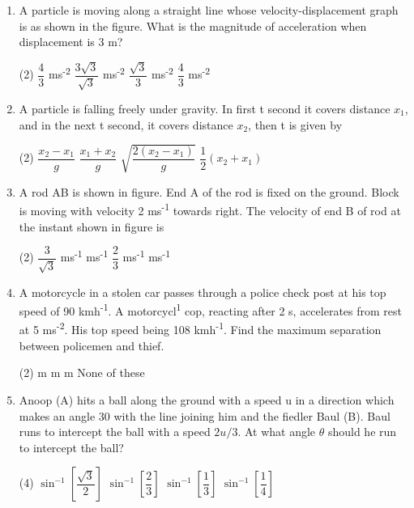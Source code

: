 \documentclass{article}
\renewcommand{\frac}[2]{\dfrac{#1}{#2}}
\begin{document}
\begin{enumerate}
    \item A particle is moving along a straight line whose velocity-displacement graph is as shown in the figure. What is the magnitude of acceleration when displacement is 3 m?
    \begin{tasks}(2)
        \task $\frac{4}{3}$ ms\textsuperscript{-2}
        \task $\frac{3\sqrt{3}}{\sqrt{3}}$ ms\textsuperscript{-2}
        \task $\frac{\sqrt{3}}{3}$ ms\textsuperscript{-2}
        \task $\frac{4}{3}$ ms\textsuperscript{-2}
    \end{tasks}

    \item A particle is falling freely under gravity. In first t second it covers distance $x_1$, and in the next t second, it covers distance $x_2$, then t is given by
    \begin{tasks}(2)
        \task $\frac{x_2 - x_1}{g}$
        \task $\frac{x_1 + x_2}{g}$
        \task $\sqrt{\frac{2(x_2 - x_1)}{g}}$
        \task $\frac{1}{2}(x_2 + x_1)$
    \end{tasks}

    \item A rod AB is shown in figure. End A of the rod is fixed on the ground. Block is moving with velocity 2 ms\textsuperscript{-1} towards right. The velocity of end B of rod at the instant shown in figure is
    \begin{tasks}(2)
        \task $\frac{3}{\sqrt{3}}$ ms\textsuperscript{-1}
         ms\textsuperscript{-1}
        \task $\frac{2}{3}$ ms\textsuperscript{-1}
         ms\textsuperscript{-1}
    \end{tasks}
    
    \item A motorcycle in a stolen car passes through a police check post at his top speed of 90 kmh\textsuperscript{-1}. A motorcycl\textsuperscript{1} cop, reacting after 2 s, accelerates from rest at 5 ms\textsuperscript{-2}. His top speed being 108 kmh\textsuperscript{-1}. Find the maximum separation between policemen and thief.
    \begin{tasks}(2)
         m
         m
         m
        \task None of these
    \end{tasks}
    
    \item Anoop (A) hits a ball along the ground with a speed u in a direction which makes an angle 30\textdegree{} with the line joining him and the fiedler Baul (B). Baul runs to intercept the ball with a speed $2u/3$. At what angle $\theta$ should he run to intercept the ball?
    \begin{tasks}(4)
        \task $\sin^{-1}\left[\frac{\sqrt{3}}{2}\right]$
        \task $\sin^{-1}\left[\frac{2}{3}\right]$
        \task $\sin^{-1}\left[\frac{1}{3}\right]$
        \task $\sin^{-1}\left[\frac{1}{4}\right]$
    \end{tasks}


\end{enumerate}
\end{document}
